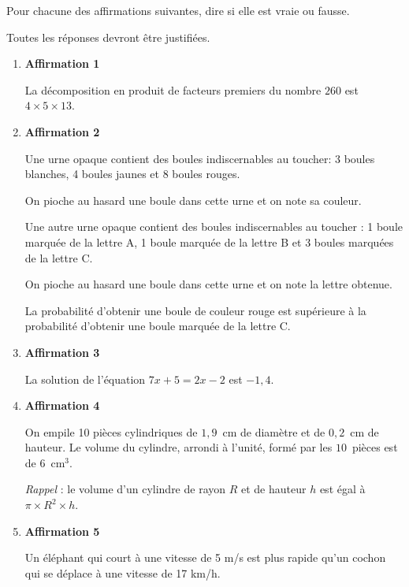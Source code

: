 \documentclass[exercice,a4]{thedocument}%
\begin{document}
%

\medskip

Pour chacune des affirmations suivantes, dire si elle est vraie ou fausse.

Toutes les réponses devront être justifiées.

\medskip

\begin{enumerate}
\item \textbf{Affirmation 1}

La décomposition en produit de facteurs premiers du nombre $260$ est $4 \times 5 \times 13$.
\item \textbf{Affirmation 2}

Une urne opaque contient des boules indiscernables au toucher: 3 boules blanches, 4 boules jaunes et 8 boules rouges.

On pioche au hasard une boule dans cette urne et on note sa couleur.

Une autre urne opaque contient des boules indiscernables au toucher : 1 boule marquée de la lettre A, 1 boule marquée de la lettre B et 3 boules marquées de la lettre C.

On pioche au hasard une boule dans cette urne et on note la lettre obtenue.

La probabilité d'obtenir une boule de couleur rouge est supérieure à la probabilité d'obtenir une boule marquée de la lettre C.
\item \textbf{Affirmation 3}

La solution de l'équation $7x + 5 = 2x - 2$ est $-1,4$.
\item \textbf{Affirmation 4}

On empile 10 pièces cylindriques de $1,9$~cm de diamètre et de $0,2$~cm de hauteur. Le volume du cylindre, arrondi à l'unité, formé par les $10$~pièces est de $6$~cm$^3$.

\emph{Rappel} : le volume d'un cylindre de rayon $R$ et de hauteur $h$ est égal à $\pi \times R^2 \times h$.
\item \textbf{Affirmation 5}

Un éléphant qui court à une vitesse de 5 m/s est plus rapide qu'un cochon qui se déplace à une vitesse de 17 km/h.
\end{enumerate}

\newpage
\showthesource
\end{document}
